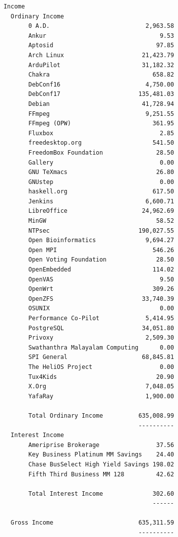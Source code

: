 \documentclass[a4paper]{report}
\begin{document}
\begin{verbatim}
 Income
   Ordinary Income
        0 A.D.                           2,963.58
        Ankur                                9.53
        Aptosid                             97.85
        Arch Linux                      21,423.79
        ArduPilot                       31,182.32
        Chakra                             658.82
        DebConf16                        4,750.00
        DebConf17                      135,481.03
        Debian                          41,728.94
        FFmpeg                           9,251.55
        FFmpeg (OPW)                       361.95
        Fluxbox                              2.85
        freedesktop.org                    541.50
        FreedomBox Foundation               28.50
        Gallery                              0.00
        GNU TeXmacs                         26.80
        GNUstep                              0.00
        haskell.org                        617.50
        Jenkins                          6,600.71
        LibreOffice                     24,962.69
        MinGW                               58.52
        NTPsec                         190,027.55
        Open Bioinformatics              9,694.27
        Open MPI                           546.26
        Open Voting Foundation              28.50
        OpenEmbedded                       114.02
        OpenVAS                              9.50
        OpenWrt                            309.26
        OpenZFS                         33,740.39
        OSUNIX                               0.00
        Performance Co-Pilot             5,414.95
        PostgreSQL                      34,051.80
        Privoxy                          2,509.30
        Swathanthra Malayalam Computing      0.00
        SPI General                     68,845.81
        The HeliOS Project                   0.00
        Tux4Kids                            20.90
        X.Org                            7,048.05
        YafaRay                          1,900.00

        Total Ordinary Income          635,008.99
                                       ----------
   Interest Income
        Ameriprise Brokerage                37.56
        Key Business Platinum MM Savings    24.40
        Chase BusSelect High Yield Savings 198.02
        Fifth Third Business MM 128         42.62

        Total Interest Income              302.60
                                           ------

   Gross Income                        635,311.59
                                       ----------


\end{verbatim}
\end{document}

